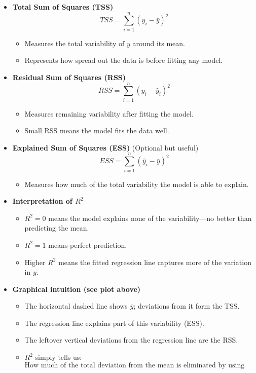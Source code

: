 \documentclass[11pt,a4paper]{article}
\begin{document}
\begin{itemize}

    \item \textbf{Total Sum of Squares (TSS)}  
    \[
        TSS = \sum_{i=1}^n (y_i - \bar{y})^2
    \]
    \begin{itemize}
        \item Measures the total variability of $y$ around its mean.  
        \item Represents how spread out the data is before fitting any model.
    \end{itemize}

    \item \textbf{Residual Sum of Squares (RSS)}  
    \[
        RSS = \sum_{i=1}^n (y_i - \hat{y}_i)^2
    \]
    \begin{itemize}
        \item Measures remaining variability after fitting the model.  
        \item Small RSS means the model fits the data well.
    \end{itemize}

    \item \textbf{Explained Sum of Squares (ESS)} (Optional but useful)  
    \[
        ESS = \sum_{i=1}^n (\hat{y}_i - \bar{y})^2
    \]
    \begin{itemize}
        \item Measures how much of the total variability the model is able to explain.
    \end{itemize}

    \item \textbf{Interpretation of $R^2$}
    \begin{itemize}
        \item $R^2 = 0$ means the model explains none of the variability—no better than predicting the mean.  
        \item $R^2 = 1$ means perfect prediction.  
        \item Higher $R^2$ means the fitted regression line captures more of the variation in $y$.
    \end{itemize}

    \item \textbf{Graphical intuition (see plot above)}
    \begin{itemize}
        \item The horizontal dashed line shows $\bar{y}$; deviations from it form the TSS.  
        \item The regression line explains part of this variability (ESS).  
        \item The leftover vertical deviations from the regression line are the RSS.  
        \item $R^2$ simply tells us:  
        \[
            \text{How much of the total deviation from the mean is eliminated by using the regression model?}
        \]
    \end{itemize}

\end{itemize}
\end{document}
